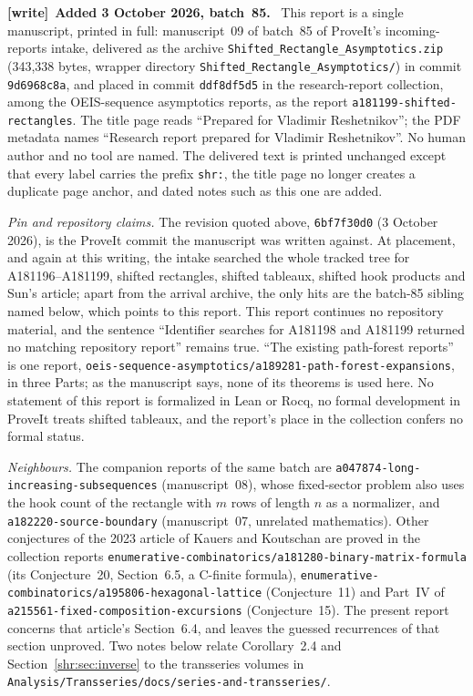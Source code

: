 \documentclass[11pt,letterpaper]{article}
\numberwithin{equation}{section}
\theoremstyle{definition}
\newcommand{\1}{\mathbf 1}
\newenvironment{writenote}[1][]{\par\smallskip\begingroup\small
 \noindent\textbf{[write]}\if\relax\detokenize{#1}\relax\else~\textbf{#1.}\fi\ }%
 {\par\endgroup\smallskip}
\begin{document}
\begin{writenote}[Added 3 October 2026, batch~85]
This report is a single manuscript, printed in full: manuscript~09 of
batch~85 of ProveIt's incoming-reports intake, delivered as the archive
\texttt{Shifted\_\allowbreak Rectangle\_\allowbreak Asymptotics.zip}
(343{,}338 bytes, wrapper directory
\texttt{Shifted\_\allowbreak Rectangle\_\allowbreak Asymptotics/}) in commit
\texttt{9d6968c8a}, and placed in commit \texttt{ddf8df5d5} in the
research-report collection, among the OEIS-sequence asymptotics reports, as
the report \texttt{a181199-\allowbreak shifted-\allowbreak rectangles}. The
title page reads ``Prepared for Vladimir Reshetnikov''; the PDF metadata
names ``Research report prepared for Vladimir Reshetnikov''. No human author
and no tool are named. The delivered text is printed unchanged except that
every label carries the prefix \texttt{shr:}, the title page no longer
creates a duplicate page anchor, and dated notes such as this one are added.

\emph{Pin and repository claims.} The revision quoted above,
\texttt{6bf7f30d0} (3 October 2026), is the ProveIt commit the manuscript
was written against. At placement, and again at this writing, the intake
searched the whole tracked tree for A181196--A181199, shifted rectangles,
shifted tableaux, shifted hook products and Sun's article; apart from the
arrival archive, the only hits are the batch-85 sibling named below, which
points to this report. This report continues no repository material, and
the sentence ``Identifier searches for A181198 and A181199 returned no matching
repository report'' remains true. ``The existing path-forest reports'' is
one report,
\texttt{oeis-sequence-asymptotics/\allowbreak a189281-path-forest-expansions},
in three Parts; as the manuscript says, none of its theorems is used here.
No statement of this report is formalized in Lean or Rocq, no formal
development in ProveIt treats shifted tableaux, and the report's place in
the collection confers no formal status.

\emph{Neighbours.} The companion reports of the same batch are
\texttt{a047874-\allowbreak long-\allowbreak increasing-\allowbreak subsequences}
(manuscript~08), whose fixed-sector problem also uses the hook count of the
rectangle with $m$ rows of length $n$ as a normalizer, and
\texttt{a182220-\allowbreak source-\allowbreak boundary} (manuscript~07,
unrelated mathematics). Other conjectures of the 2023 article of Kauers
and Koutschan \cite{KK} are proved in the collection reports
\texttt{enumerative-\allowbreak combinatorics/\allowbreak a181280-\allowbreak binary-\allowbreak matrix-\allowbreak formula}
(its Conjecture~20, Section~6.5, a C-finite formula),
\texttt{enumerative-\allowbreak combinatorics/\allowbreak a195806-\allowbreak hexagonal-\allowbreak lattice}
(Conjecture~11) and Part~IV of
\texttt{a215561-\allowbreak fixed-\allowbreak composition-\allowbreak excursions}
(Conjecture~15). The present report concerns that article's Section~6.4,
and leaves the guessed recurrences of that section unproved. Two notes below relate Corollary~2.4 and Section~\ref{shr:sec:inverse}
to the transseries volumes in
\texttt{Analysis/\allowbreak Transseries/\allowbreak docs/\allowbreak series-\allowbreak and-\allowbreak transseries/}.


\end{writenote}
\end{document}
